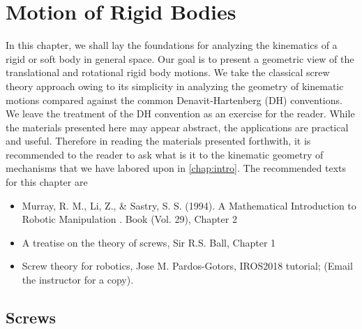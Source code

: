 \chapter{Motion of Rigid Bodies}
\label{chap:rbm}

In this chapter, we shall lay the foundations for analyzing the kinematics of a rigid or soft body in general space. Our goal is to present a geometric view of the translational and rotational rigid body motions. We take the classical screw theory approach owing to its simplicity in analyzing the geometry of kinematic motions compared against the common Denavit-Hartenberg (DH) conventions. We leave the treatment of the DH convention as an exercise for the reader. While the materials presented here may appear abstract, the applications are practical and useful. Therefore in reading the materials presented forthwith, it is recommended to the reader to ask what is it to the kinematic geometry of mechanisms that we have labored upon in \autoref{chap:intro}. The recommended texts for this chapter are 

\begin{itemize}
	\item Murray, R. M., Li, Z., \& Sastry, S. S. (1994). A Mathematical Introduction to
Robotic Manipulation . Book (Vol. 29), Chapter 2
	\item A treatise on the theory of screws, Sir R.S. Ball, Chapter 1
	\item Screw theory for robotics, Jose M. Pardos-Gotors, IROS2018 tutorial; (Email the instructor for a copy).
\end{itemize}


\section{Screws}

